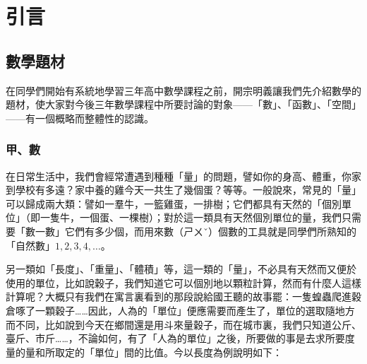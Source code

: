 
\section{引言}\label{sec:ch1}

\subsection{數學題材}\label{sec:1-1}

在同學們開始有系統地學習三年高中數學課程之前，開宗明義讓我們先介紹數學的題材，使大家對今後三年數學課程中所要討論的對象——「數」、「函數」、「空間」——有一個概略而整體性的認識。

\subsubsection*{甲、數}\label{subsec:number}

在日常生活中，我們會經常遭遇到種種「量」的問題，譬如你的身高、體重，你家到學校有多遠？家中養的雞今天一共生了幾個蛋？等等。一般說來，常見的「量」可以歸成兩大類：譬如一羣牛，一籃雞蛋，一排樹；它們都具有天然的「個別單位」（即一隻牛，一個蛋、一棵樹）；對於這一類具有天然個別單位的量，我們只需要「數一數」它們有多少個，而用來數（ㄕㄨˇ）個數的工具就是同學們所熟知的「自然數」$1, 2, 3, 4, \dots$。

另一類如「長度」、「重量」、「體積」等，這一類的「量」，不必具有天然而又便於使用的單位，比如說穀子，我們知道它可以個別地以顆粒計算，然而有什麼人這樣計算呢？大概只有我們在寓言裏看到的那段說給國王聽的故事罷：一隻蝗蟲爬進穀倉啄了一顆穀子……因此，人為的「單位」便應需要而產生了，單位的選取隨地方而不同，比如說到今天在鄉間還是用斗來量穀子，而在城市裏，我們只知道公斤、臺斤、市斤……，不論如何，有了「人為的單位」之後，所要做的事是去求所要度量的量和所取定的「單位」間的比值。今以長度為例說明如下：

\begin{center}
\end{center}

